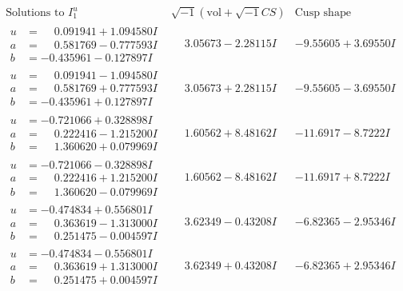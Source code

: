 \documentclass[1p]{elsarticle_modified}
\theoremstyle{definition}
\newcommand{\I}{\sqrt{-1}}
\begin{document}
$$\begin{array}{c|c|c}  
\text{Solutions to }I^u_{1}& \I (\text{vol} + \sqrt{-1}CS) & \text{Cusp shape}\\
 \hline 
\begin{aligned}
u &= \phantom{-}0.091941 + 1.094580 I \\
a &= \phantom{-}0.581769 - 0.777593 I \\
b &= -0.435961 - 0.127897 I\end{aligned}
 & \phantom{-}3.05673 - 2.28115 I & -9.55605 + 3.69550 I \\ \hline\begin{aligned}
u &= \phantom{-}0.091941 - 1.094580 I \\
a &= \phantom{-}0.581769 + 0.777593 I \\
b &= -0.435961 + 0.127897 I\end{aligned}
 & \phantom{-}3.05673 + 2.28115 I & -9.55605 - 3.69550 I \\ \hline\begin{aligned}
u &= -0.721066 + 0.328898 I \\
a &= \phantom{-}0.222416 - 1.215200 I \\
b &= \phantom{-}1.360620 + 0.079969 I\end{aligned}
 & \phantom{-}1.60562 + 8.48162 I & -11.6917 - 8.7222 I \\ \hline\begin{aligned}
u &= -0.721066 - 0.328898 I \\
a &= \phantom{-}0.222416 + 1.215200 I \\
b &= \phantom{-}1.360620 - 0.079969 I\end{aligned}
 & \phantom{-}1.60562 - 8.48162 I & -11.6917 + 8.7222 I \\ \hline\begin{aligned}
u &= -0.474834 + 0.556801 I \\
a &= \phantom{-}0.363619 - 1.313000 I \\
b &= \phantom{-}0.251475 - 0.004597 I\end{aligned}
 & \phantom{-}3.62349 - 0.43208 I & -6.82365 - 2.95346 I \\ \hline\begin{aligned}
u &= -0.474834 - 0.556801 I \\
a &= \phantom{-}0.363619 + 1.313000 I \\
b &= \phantom{-}0.251475 + 0.004597 I\end{aligned}
 & \phantom{-}3.62349 + 0.43208 I & -6.82365 + 2.95346 I \\ \hline\begin{aligned}

\end{aligned}
\end{array}$$
\end{document}
